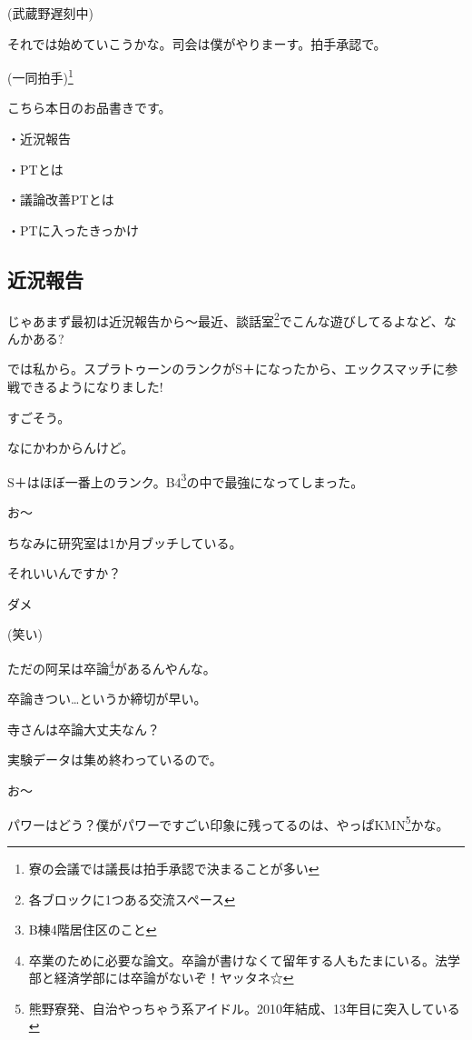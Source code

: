 \begin{multicols}{2}

(武蔵野遅刻中)



それでは始めていこうかな。司会は僕がやりまーす。拍手承認で。

(一同拍手)\footnote{寮の会議では議長は拍手承認で決まることが多い}



こちら本日のお品書きです。



・近況報告

・PTとは

・議論改善PTとは

・PTに入ったきっかけ



\subsection{近況報告}

じゃあまず最初は近況報告から〜最近、談話室\footnote{各ブロックに1つある交流スペース}でこんな遊びしてるよなど、なんかある?

では私から。スプラトゥーンのランクがS＋になったから、エックスマッチに参戦できるようになりました!

すごそう。

なにかわからんけど。

S＋はほぼ一番上のランク。B4\footnote{B棟4階居住区のこと}の中で最強になってしまった。

お〜

ちなみに研究室は1か月ブッチしている。

それいいんですか？

ダメ

(笑い)

ただの阿呆は卒論\footnote{卒業のために必要な論文。卒論が書けなくて留年する人もたまにいる。法学部と経済学部には卒論がないぞ！ヤッタネ☆}があるんやんな。

卒論きつい…というか締切が早い。

寺さんは卒論大丈夫なん？

実験データは集め終わっているので。

お〜

パワーはどう？僕がパワーですごい印象に残ってるのは、やっぱKMN\footnote{熊野寮発、自治やっちゃう系アイドル。2010年結成、13年目に突入している}かな。


\end{multicols}
